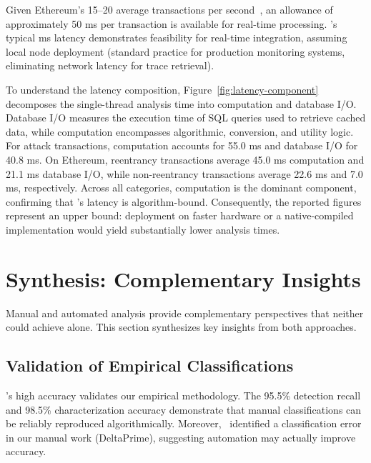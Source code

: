 Given Ethereum's 15--20 average transactions per second~\cite{eth-chart}, an allowance of approximately 50 ms per transaction is available for real-time processing. \ToolName's typical  ms latency demonstrates feasibility for real-time integration, assuming local node deployment (standard practice for production monitoring systems, eliminating network latency for trace retrieval).


To understand the latency composition, Figure~\ref{fig:latency-component} decomposes the single-thread analysis time into computation and database I/O. Database I/O measures the execution time of SQL queries used to retrieve cached data, while computation encompasses algorithmic, conversion, and utility logic. For attack transactions, computation accounts for 55.0 ms and database I/O for 40.8 ms. On Ethereum, reentrancy transactions average 45.0 ms computation and 21.1 ms database I/O, while non-reentrancy transactions average 22.6 ms and 7.0 ms, respectively. Across all categories, computation is the dominant component, confirming that \ToolName's latency is algorithm-bound. Consequently, the reported figures represent an upper bound: deployment on faster hardware or a native-compiled implementation would yield substantially lower analysis times.

\section{Synthesis: Complementary Insights}
\label{sec:results-synthesis}

Manual and automated analysis provide complementary perspectives that neither could achieve alone. This section synthesizes key insights from both approaches.

\subsection{Validation of Empirical Classifications}

\ToolName's high accuracy validates our empirical methodology. The 95.5\% detection recall and 98.5\% characterization accuracy demonstrate that manual classifications can be reliably reproduced algorithmically. Moreover, \ToolName\ identified a classification error in our manual work (DeltaPrime), suggesting automation may actually improve accuracy.


